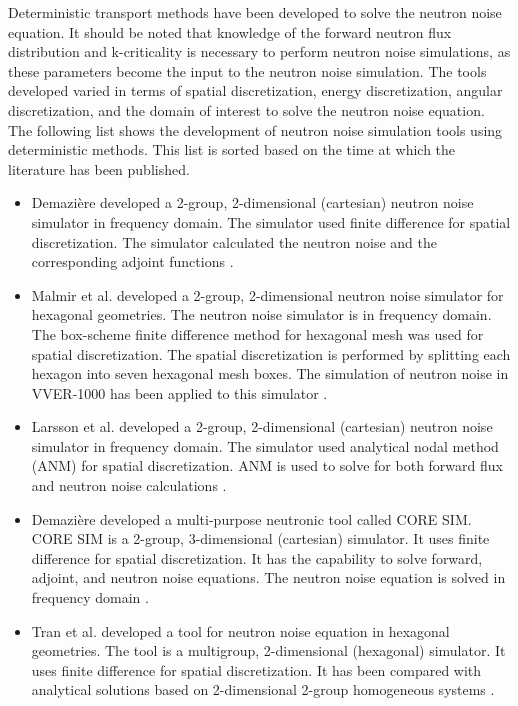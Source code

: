 Deterministic transport methods have been developed to solve the neutron noise equation. It should be noted that knowledge of the forward neutron flux distribution and k-criticality is necessary to perform neutron noise simulations, as these parameters become the input to the neutron noise simulation. The tools developed varied in terms of spatial discretization, energy discretization, angular discretization, and the domain of interest to solve the neutron noise equation. The following list shows the development of neutron noise simulation tools using deterministic methods. This list is sorted based on the time at which the literature has been published.
\begin{itemize}
    \item Demazi\`ere developed a 2-group, 2-dimensional (cartesian) neutron noise simulator in frequency domain. The simulator used finite difference for spatial discretization. The simulator calculated the neutron noise and the corresponding adjoint functions \cite{demaziereDevelopment2D2group2004}.
    \item Malmir et al. developed a 2-group, 2-dimensional neutron noise simulator for hexagonal geometries. The neutron noise simulator is in frequency domain. The box-scheme finite difference method for hexagonal mesh was used for spatial discretization. The spatial discretization is performed by splitting each hexagon into seven hexagonal mesh boxes. The simulation of neutron noise in VVER-1000 has been applied to this simulator \cite{malmirDevelopment2D2group2010}.
    \item Larsson et al. developed a 2-group, 2-dimensional (cartesian) neutron noise simulator in frequency domain. The simulator used analytical nodal method (ANM) for spatial discretization. ANM is used to solve for both forward flux and neutron noise calculations \cite{larssonNeutronNoiseCalculations2011}.
    \item Demazi\`ere developed a multi-purpose neutronic tool called CORE SIM. CORE SIM is a 2-group, 3-dimensional (cartesian) simulator. It uses finite difference for spatial discretization. It has the capability to solve forward, adjoint, and neutron noise equations. The neutron noise equation is solved in frequency domain \cite{demaziereCORESIMMultipurpose2011}.
    \item Tran et al. developed a tool for neutron noise equation in hexagonal geometries. The tool is a multigroup, 2-dimensional (hexagonal) simulator. It uses finite difference for spatial discretization. It has been compared with analytical solutions based on 2-dimensional 2-group homogeneous systems \cite{tranNeutronNoiseCalculations2013}.

\end{itemize}
